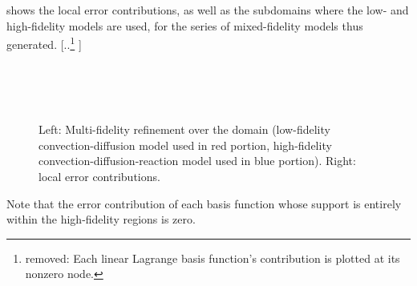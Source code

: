 \documentclass[review]{siamart0516}
\providecommand{\DIFdeltex}[1]{{\protect\color{red} [..\footnote{removed: #1} ]}} %
\providecommand{\DIFdelbegin}{} %
\providecommand{\DIFdelend}{} %
\providecommand{\DIFdel}[1]{\texorpdfstring{\DIFdeltex{#1}}{}} %
\newcommand{\DIFscaledelfig}{0.5}
\newlength{\DIFdelgraphicswidth} %
\newlength{\DIFdelgraphicsheight} %
\newcommand{\DIFdelincludegraphics}[2][]{%
\sbox{\DIFdelgraphicsbox}{\DIFOincludegraphics[#1]{#2}}%
\settoboxwidth{\DIFdelgraphicswidth}{\DIFdelgraphicsbox} %
\settoboxtotalheight{\DIFdelgraphicsheight}{\DIFdelgraphicsbox} %
\scalebox{\DIFscaledelfig}{%
\parbox[b]{\DIFdelgraphicswidth}{\usebox{\DIFdelgraphicsbox}\\[-\baselineskip] \rule{\DIFdelgraphicswidth}{0em}}\llap{\resizebox{\DIFdelgraphicswidth}{\DIFdelgraphicsheight}{%
\setlength{\unitlength}{\DIFdelgraphicswidth}%
\begin{picture}(1,1)%
\thicklines\linethickness{2pt} %
{\color[rgb]{1,0,0}\put(0,0){\framebox(1,1){}}}%
{\color[rgb]{1,0,0}\put(0,0){\line( 1,1){1}}}%
{\color[rgb]{1,0,0}\put(0,1){\line(1,-1){1}}}%
\end{picture}%
}\hspace*{3pt}}} %
} %
\DeclareRobustCommand{\DIFdelbegin}{\DIFOdelbegin \let\includegraphics\DIFdelincludegraphics} %
\DeclareRobustCommand{\DIFdelend}{\DIFOaddend \let\includegraphics\DIFOincludegraphics} %
\begin{document}
 shows the local error contributions, as well as the subdomains where the low- and high-fidelity models are used, for the series of mixed-fidelity models thus generated. \DIFdelbegin \DIFdel{Each linear Lagrange basis function's contribution is plotted at its nonzero node.
}\DIFdelend %
%
\begin{figure}[htbp]
\centering
{} \\
 \\
 \\
\caption{Left: Multi-fidelity refinement over the domain (low-fidelity convection-diffusion model used in red portion, high-fidelity convection-diffusion-reaction model used in blue portion). Right: local error contributions. }
\label{fig:baseRef}
\end{figure}
%
Note that the error contribution of each basis function whose support is entirely within the high-fidelity regions is zero.
\end{document}
